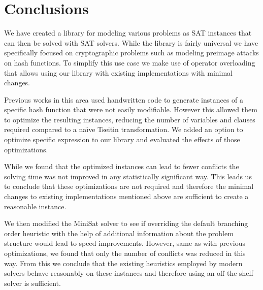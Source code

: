 \chapter{Conclusions}
We have created a library for modeling various problems as SAT instances that can then be solved with SAT solvers.
While the library is fairly universal we have specifically focused on cryptographic problems such as modeling preimage attacks on hash functions.
To simplify this use case we make use of operator overloading that allows using our library with existing implementations with minimal changes.

Previous works in this area used handwritten code to generate instances of a specific hash function that were not easily modifiable.
However this allowed them to optimize the resulting instances, reducing the number of variables and clauses required compared to a na\"{\i}ve Tseitin transformation.
We added an option to optimize specific expression to our library and evaluated the effects of those optimizations.

While we found that the optimized instances can lead to fewer conflicts the solving time was not improved in any statistically significant way.
This leads us to conclude that these optimizations are not required and therefore the minimal changes to existing implementations mentioned above are sufficient to create a reasonable instance.

We then modified the MiniSat solver to see if overriding the default branching order heuristic with the help of additional information about the problem structure would lead to speed improvements.
However, same as with previous optimizations, we found that only the number of conflicts was reduced in this way.
From this we conclude that the existing heuristics employed by modern solvers behave reasonably on these instances and therefore using an off-the-shelf solver is sufficient.
